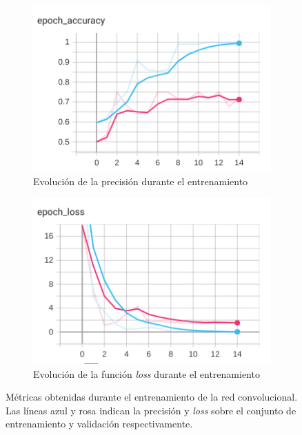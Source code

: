 \begin{figure}[h!]
    \begin{subfigure}[c]{.5\textwidth}
      \centering
      \includegraphics[width=.9\linewidth]{img/interseccionesAcc.png}
      \caption[Precisión del entrenamiento del modelo de intersecciones]{Evolución de la precisión durante el entrenamiento}
      \label{fig:interseccionesAcc}
    \end{subfigure}%
    \begin{subfigure}[c]{.5\textwidth}
      \centering
      \includegraphics[width=.9\linewidth]{img/interseccionesLoss.png}
      \caption[\textit{Loss} del entrenamiento del modelo de intersecciones]{Evolución de la función \textit{loss} durante el entrenamiento}
      \label{fig:interseccionesLoss}
    \end{subfigure}
    
    \caption[Métricas obtenidas durante el entrenamiento del detector de intersecciones]{Métricas obtenidas durante el entrenamiento de la red convolucional. Las líneas azul y rosa indican la precisión y \textit{loss} sobre el conjunto de entrenamiento y validación respectivamente.}
    \label{fig:graficasInters}
\end{figure}

